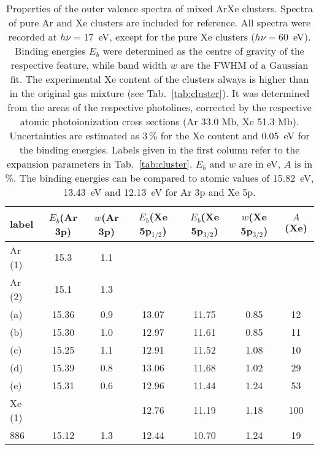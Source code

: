 \begin{table}
\caption{Properties of the outer valence spectra of mixed ArXe clusters. Spectra of pure Ar and Xe clusters are included for reference. All spectra were recorded at $h\nu = 17$~eV, except for the pure Xe clusters ($h\nu = 60$~eV). Binding energies $E_b$ were determined as the centre of gravity of the respective feature, while band width $w$ are the FWHM of a Gaussian fit. The experimental Xe content of the clusters always is higher than in the original gas mixture (see Tab.\ \protect\ref{tab:cluster}). It was determined from the areas of the respective photolines, corrected by the respective atomic photoionization cross sections (Ar 33.0 Mb, Xe 51.3 Mb)\cite{samson2002}. Uncertainties are estimated as 3\,\% for the Xe content and 0.05~eV for the binding energies. Labels given in the first column refer to the expansion parameters in Tab.\ \protect\ref{tab:cluster}. $E_b$ and $w$ are in eV, $A$ is in \%. The binding energies can be compared to atomic values of 15.82~eV, 13.43~eV and 12.13~eV for Ar 3p and Xe 5p.
\label{tab:valence} }
\begin{tabular}{ l c c c c c c}
%
\toprule
  label & $E_b$(Ar 3p) & $w$(Ar 3p) & $E_b$(Xe 5p$_{1/2}$) &  $E_b$(Xe 5p$_{3/2}$) & $w$(Xe 5p$_{3/2}$)  &  $A$(Xe) \\
%
\midrule
 Ar (1) &  15.3  &  1.1 & & & &  \\
 Ar (2) &  15.1  &  1.3 & & & &  \\
%
 (a) & 15.36 & 0.9 & 13.07 & 11.75 & 0.85 & 12\\
 (b) & 15.30 & 1.0 & 12.97 & 11.61 & 0.85 & 11\\
 (c) & 15.25 & 1.1 & 12.91 & 11.52 & 1.08 & 10\\
 (d) & 15.39 & 0.8 & 13.06 & 11.68 & 1.02 & 29\\
 (e) & 15.31 & 0.6 & 12.96 & 11.44 & 1.24 & 53\\
Xe (1) & & & 12.76 & 11.19 & 1.18 & 100\\
%
\midrule
%
 886 & 15.12 & 1.3 & 12.44 & 10.70 & 1.24 & 19\\
\bottomrule
\end{tabular}
\end{table}
